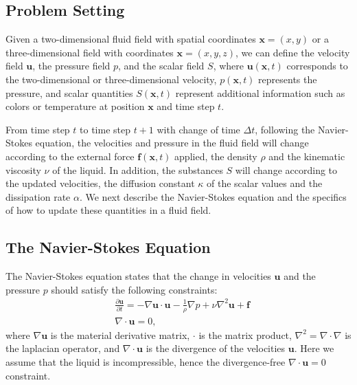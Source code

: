 \documentclass[sigconf]{acmart}
\begin{document}
\subsection{Problem Setting}
Given a two-dimensional fluid field with spatial coordinates $\mathbf{x} = (x, y)$ or a three-dimensional field with coordinates $\mathbf{x} = (x, y, z)$, we can define the velocity field $\mathbf{u}$, the pressure field $p$, and the scalar field $S$, where $\mathbf{u}(\mathbf{x}, t)$ corresponds to the two-dimensional or three-dimensional velocity, $p(\mathbf{x}, t)$ represents the pressure, and scalar quantities $S(\mathbf{x}, t)$ represent additional information such as colors or temperature at position $\mathbf{x}$ and time step $t$.

From time step $t$ to time step $t + 1$ with change of time $\Delta t$, following the Navier-Stokes equation, the velocities and pressure in the fluid field will change according to the external force $\mathbf{f}(\mathbf{x}, t)$ applied, the density $\rho$ and the kinematic viscosity $\nu$ of the liquid. In addition, the substances $S$ will change according to the updated velocities, the diffusion constant $\kappa$ of the scalar values and the dissipation rate $\alpha$. We next describe the Navier-Stokes equation and the specifics of how to update these quantities in a fluid field.

\subsection{The Navier-Stokes Equation}
The Navier-Stokes equation states that the change in velocities $\mathbf{u}$ and the pressure $p$ should satisfy the following constraints:
\begin{equation}
\label{eq:stokes}
\begin{split}
  &\frac{\partial \mathbf{u}}{\partial t} = -\nabla\mathbf{u} \cdot \mathbf{u} - \frac{1}{\rho}\nabla p + \nu\nabla^2\mathbf{u} + \mathbf{f}\\
  &\nabla\cdot\mathbf{u} = 0,
\end{split}
\end{equation}
where $\nabla\mathbf{u}$ is the material derivative matrix, $\cdot$ is the matrix product, $\nabla^2 = \nabla\cdot\nabla$ is the laplacian operator, and $\nabla\cdot\mathbf{u}$ is the divergence of the velocities $\mathbf{u}$. Here we assume that the liquid is incompressible, hence the divergence-free $\nabla\cdot\mathbf{u} = 0$ constraint.
\end{document}

